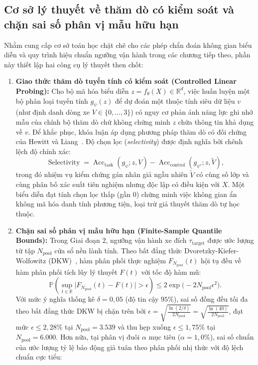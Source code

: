 \documentclass[12pt, a4paper, reqno, oneside]{book}
\begin{document}
\subsection{Cơ sở lý thuyết về thăm dò có kiểm soát và chặn sai số phân vị mẫu hữu hạn}\label{subsec:theory-probing-dkw}
Nhằm cung cấp cơ sở toán học chặt chẽ cho các phép chẩn đoán không gian biểu diễn và quy trình hiệu chuẩn ngưỡng vận hành trong các chương tiếp theo, phần này thiết lập hai công cụ lý thuyết then chốt:

\begin{enumerate}
    \item \textbf{Giao thức thăm dò tuyến tính có kiểm soát (Controlled Linear Probing):} Cho bộ mã hóa biểu diễn $z = f_\theta(X) \in \mathbb{R}^d$, việc huấn luyện một bộ phân loại tuyến tính $g_\psi(z)$ để dự đoán một thuộc tính siêu dữ liệu $v$ (như định danh dòng xe $V \in \{0, \ldots, 3\}$) có nguy cơ phản ánh năng lực ghi nhớ mẫu của chính bộ thăm dò chứ không chứng minh $z$ chứa thông tin khả dụng về $v$. Để khắc phục, khóa luận áp dụng phương pháp thăm dò có đối chứng của Hewitt và Liang~\cite{hewitt2019probes}. Độ chọn lọc (\textit{selectivity}) được định nghĩa bởi chênh lệch độ chính xác:
    \begin{equation}\label{eq:probe-selectivity}
    \operatorname{Selectivity} = \operatorname{Acc}_{\text{task}}(g_\psi; z, V) - \operatorname{Acc}_{\text{control}}(g_{\psi'}; z, \widetilde{V}),
    \end{equation}
    trong đó nhiệm vụ kiểm chứng gán nhãn giả ngẫu nhiên $\widetilde{V}$ có cùng số lớp và cùng phân bố xác suất tiên nghiệm nhưng độc lập có điều kiện với $X$. Một biểu diễn đạt tính chọn lọc thấp (gần $0$) chứng minh việc không gian ẩn không mã hóa danh tính phương tiện, loại trừ giả thuyết thăm dò tự học thuộc.
    \item \textbf{Chặn sai số phân vị mẫu hữu hạn (Finite-Sample Quantile Bounds):} Trong Giai đoạn 2, ngưỡng vận hành xe đích $\tau_{\text{target}}$ được ước lượng từ tập $N_{\text{pool}}$ cửa sổ nền lành tính. Theo bất đẳng thức Dvoretzky-Kiefer-Wolfowitz (DKW)~\cite{massart1990dkw}, hàm phân phối thực nghiệm $F_{N_{\text{pool}}}(t)$ hội tụ đều về hàm phân phối tích lũy lý thuyết $F(t)$ với tốc độ hàm mũ:
    \begin{equation}\label{eq:dkw-inequality}
    \mathbb{P}\left(\sup_{t \in \mathbb{R}} \big| F_{N_{\text{pool}}}(t) - F(t) \big| > \epsilon\right) \le 2\exp\big(-2 N_{\text{pool}} \epsilon^2\big).
    \end{equation}
    Với mức ý nghĩa thống kê $\delta = 0{,}05$ (độ tin cậy $95\%$), sai số đồng đều tối đa theo bất đẳng thức DKW bị chặn trên bởi $\epsilon = \sqrt{\frac{\ln(2/\delta)}{2 N_{\text{pool}}}} = \sqrt{\frac{\ln(40)}{2 N_{\text{pool}}}}$, đạt mức $\epsilon \le 2{,}28\%$ tại $N_{\text{pool}}=3.539$ và thu hẹp xuống $\epsilon \le 1{,}75\%$ tại $N_{\text{pool}}=6.000$. Hơn nữa, tại phân vị đuôi $\alpha$ mục tiêu ($\alpha = 1{,}0\%$), sai số chuẩn của ước lượng tỷ lệ báo động giả tuân theo phân phối nhị thức với độ lệch chuẩn cực tiểu:

\end{enumerate}
\end{document}
